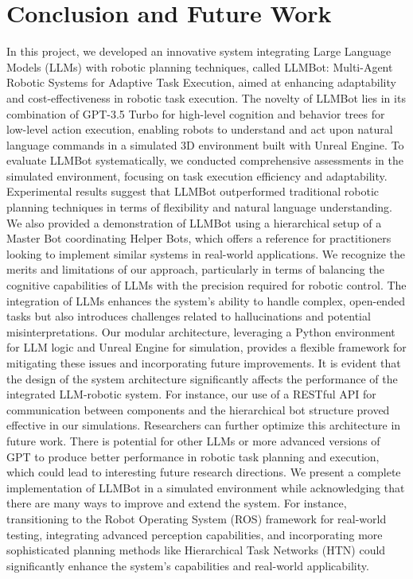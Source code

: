 \documentclass[pdflatex,sn-mathphys-num]{sn-jnl}%
\theoremstyle{thmstyleone}%
\theoremstyle{thmstyletwo}%
\theoremstyle{thmstylethree}%
\begin{document}
\section{Conclusion and Future Work}
In this project, we developed an innovative system integrating Large Language Models (LLMs) with robotic planning techniques, called LLMBot: Multi-Agent Robotic Systems for Adaptive Task Execution, aimed at enhancing adaptability and cost-effectiveness in robotic task execution. The novelty of LLMBot lies in its combination of GPT-3.5 Turbo for high-level cognition and behavior trees for low-level action execution, enabling robots to understand and act upon natural language commands in a simulated 3D environment built with Unreal Engine.
To evaluate LLMBot systematically, we conducted comprehensive assessments in the simulated environment, focusing on task execution efficiency and adaptability. Experimental results suggest that LLMBot outperformed traditional robotic planning techniques in terms of flexibility and natural language understanding. We also provided a demonstration of LLMBot using a hierarchical setup of a Master Bot coordinating Helper Bots, which offers a reference for practitioners looking to implement similar systems in real-world applications.
We recognize the merits and limitations of our approach, particularly in terms of balancing the cognitive capabilities of LLMs with the precision required for robotic control. The integration of LLMs enhances the system's ability to handle complex, open-ended tasks but also introduces challenges related to hallucinations and potential misinterpretations. Our modular architecture, leveraging a Python environment for LLM logic and Unreal Engine for simulation, provides a flexible framework for mitigating these issues and incorporating future improvements.
It is evident that the design of the system architecture significantly affects the performance of the integrated LLM-robotic system. For instance, our use of a RESTful API for communication between components and the hierarchical bot structure proved effective in our simulations. Researchers can further optimize this architecture in future work. There is potential for other LLMs or more advanced versions of GPT to produce better performance in robotic task planning and execution, which could lead to interesting future research directions.
We present a complete implementation of LLMBot in a simulated environment while acknowledging that there are many ways to improve and extend the system. For instance, transitioning to the Robot Operating System (ROS) framework for real-world testing, integrating advanced perception capabilities, and incorporating more sophisticated planning methods like Hierarchical Task Networks (HTN) could significantly enhance the system's capabilities and real-world applicability.
\end{document}
